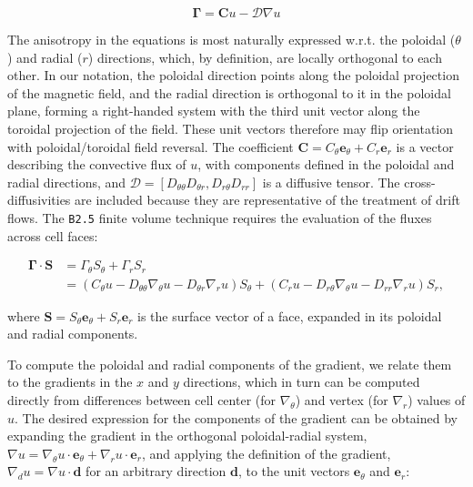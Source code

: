 \begin{equation*}
\mathbf{\Gamma} = \mathbf{C} u - \mathcal{D} \nabla u
\end{equation*}

The anisotropy in the equations is most naturally expressed w.r.t.
the poloidal ($\theta$) and radial ($r$) directions, which, by definition, are locally
orthogonal to each other. In our notation, the poloidal direction
points along the poloidal projection of the magnetic field, and the
radial direction is orthogonal to it in the poloidal plane, forming a
right-handed system with the third unit vector along the toroidal
projection of the field. These unit vectors therefore may flip orientation
with poloidal/toroidal field reversal. The coefficient
$\mathbf{C} = C_\theta \mathbf{e}_\theta + C_r \mathbf{e}_r$ is a vector describing the convective
flux of $u$, with components
defined in the poloidal and radial directions, and $\mathcal{D} = [D_{\theta \theta} D_{\theta r}, D_{r \theta} D_{r r}]$
is a diffusive tensor. The cross-diffusivities are included
because they are representative of the treatment of drift flows.
The {\tt B2.5} finite volume technique requires the evaluation of the fluxes across
cell faces:

\begin{align*}
 \mathbf{\Gamma} \cdot \mathbf{S} & = \Gamma_\theta S_\theta + \Gamma_r S_r \\
 & = \left( C_\theta u - D_{\theta \theta} \nabla_\theta u - D_{\theta r} \nabla_r u \right) S_\theta +
 \left( C_r u - D_{r \theta} \nabla_\theta u - D_{r r} \nabla_r u \right) S_r,
 \end{align*}

where $\mathbf{S} = S_\theta \mathbf{e}_\theta +  S_r \mathbf{e}_r $
is the surface vector of a face, expanded in its
poloidal and radial components.

To compute the poloidal and radial components of the gradient,
we relate them to the gradients in the $x$ and $y$
directions, which in turn can be computed directly from differences
between cell center (for $\nabla_\theta$) and vertex (for $\nabla_r$) values of $u$. The
desired expression for the components of the gradient can be obtained
by expanding the gradient in the orthogonal poloidal-radial system,
$\nabla u = \nabla_\theta u \cdot \mathbf{e}_\theta + \nabla_r u \cdot \mathbf{e}_r$,
and applying the definition of the gradient, $\nabla_d u = \nabla u \cdot \mathbf{d}$
for an arbitrary direction $\mathbf{d}$, to the unit vectors $\mathbf{e}_\theta$ and
$\mathbf{e}_r$:

